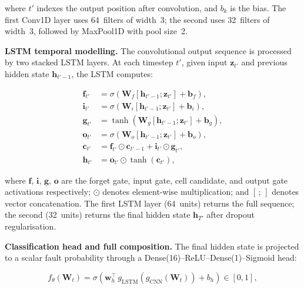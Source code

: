 \documentclass[sensors,article,submit,pdftex,moreauthors]{Definitions/mdpi}
\begin{document}
\noindent where $t'$ indexes the output position after convolution,
and $b_k$ is the bias.
The first Conv1D layer uses 64~filters of width~3; the second uses
32~filters of width~3, followed by MaxPool1D with pool size~2.

\textbf{LSTM temporal modelling.}
The convolutional output sequence is processed by two stacked LSTM
layers.
At each timestep $t'$, given input $\mathbf{z}_{t'}$ and previous
hidden state $\mathbf{h}_{t'-1}$, the LSTM computes:

\begin{linenomath}
\begin{align}
\mathbf{f}_{t'} &= \sigma\!\left(
  \mathbf{W}_f[\mathbf{h}_{t'-1};\mathbf{z}_{t'}] + \mathbf{b}_f
  \right), \label{eq:lstm-f} \\
\mathbf{i}_{t'} &= \sigma\!\left(
  \mathbf{W}_i[\mathbf{h}_{t'-1};\mathbf{z}_{t'}] + \mathbf{b}_i
  \right), \label{eq:lstm-i} \\
\mathbf{g}_{t'} &= \tanh\!\left(
  \mathbf{W}_g[\mathbf{h}_{t'-1};\mathbf{z}_{t'}] + \mathbf{b}_g
  \right), \label{eq:lstm-g} \\
\mathbf{o}_{t'} &= \sigma\!\left(
  \mathbf{W}_o[\mathbf{h}_{t'-1};\mathbf{z}_{t'}] + \mathbf{b}_o
  \right), \label{eq:lstm-o} \\
\mathbf{c}_{t'} &= \mathbf{f}_{t'} \odot \mathbf{c}_{t'-1}
  + \mathbf{i}_{t'} \odot \mathbf{g}_{t'}, \label{eq:lstm-c} \\
\mathbf{h}_{t'} &= \mathbf{o}_{t'} \odot
  \tanh(\mathbf{c}_{t'}), \label{eq:lstm-h}
\end{align}
\end{linenomath}

\noindent where $\mathbf{f}$, $\mathbf{i}$, $\mathbf{g}$,
$\mathbf{o}$ are the forget gate, input gate, cell candidate, and
output gate activations respectively; $\odot$ denotes element-wise
multiplication; and $[\,;\,]$ denotes vector concatenation.
The first LSTM layer (64~units) returns the full sequence; the
second (32~units) returns the final hidden state
$\mathbf{h}_{T'}$ after dropout regularisation.

\textbf{Classification head and full composition.}
The final hidden state is projected to a scalar fault probability
through a Dense(16)--ReLU--Dense(1)--Sigmoid head:

\begin{linenomath}
\begin{equation}
f_\theta(\mathbf{W}_t)
  = \sigma\!\left(\mathbf{w}_h^\top\,
    g_\text{LSTM}\!\left(g_\text{CNN}(\mathbf{W}_t)\right) + b_h
  \right) \in [0,1],
\label{eq:composition}
\end{equation}
\end{linenomath}
\end{document}
